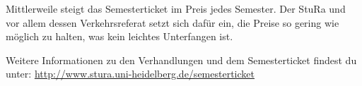 Mittlerweile steigt das Semesterticket im Preis jedes Semester. Der StuRa und vor allem dessen Verkehrsreferat setzt sich dafür ein, die Preise so gering wie möglich zu halten, was kein leichtes Unterfangen ist.

Weitere Informationen zu den Verhandlungen und dem Semesterticket findest du unter: \url{http://www.stura.uni-heidelberg.de/semesterticket}
